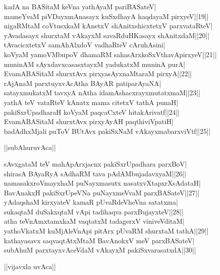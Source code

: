\documentclass{article}
\begin{document}
kadA na BASitaM keVna  yathAyaM pariBASateV|\\
mameYvaM piVDayxmAnasayx kuSxdhayA haqdayaM pirxyeV||19||\\
nigaRMtaM coVtusxkaM kAnetxV shAnitxshicxtetxV parxvataRteV|\\
yAvadasayx shurxtaM vAkayxM savaRduHKasayx shAnitxdaM||20||\\
tAvacicxtetxV samAhAlxdoV vadhaRteV cAruhAsini|\\
koVyaM yamoVMbupoV dhamaRM sahasArxkoSxVthavApirxyeV||21||\\
muninAM sAyxdavxcasasxtayxM yadukatxM muninA purA|\\
EvamABASitaM shurxtAvx pirxyasAyxnaMtaraM pirxyA||22||\\
rAjAnaM parxtuyxvAcAtha BAyAR patiparAyaNA|\\
satayxmukatxM tavxyA nAtha idamAshacxrayxmutatxmaM||23||\\
yathA teV vataRteV kAnatx mama citetxV tathA punaH|\\
pakiSxrUpadharaH koVyaM paqcaCxteV hitakArivatf||24||\\
EvamABASitaM shurxtAvx pirxyAyAH paqthiviVpatiH|\\
badAdhxMjali puToV BUtAvx pakiSxNaM vAkayxmabarxviVtf||25||\\

\begin{center}
||subAhuruvAca||
\end{center}

sAvxgataM teV mahApArxjacnx pakiSxrUpadhara parxBoV|\\
shirasA BAyaRyA sAdhaRM tava pAdAMbujadavxyaM||26||\\
namasakxroVmayxhaM puNayxmasutx nasatxvXtapxrXsAdataH|\\
BavAnakxH pakiSxrUpeVNa puNayxmeVvaM parxBASateV||27||\\
yAdaqshaM kirxyateV kamaR pUvaRdeVheVna satatxma|\\
sukaqtaM duSakxqtaM vApi tadihaqva parxBujayxteV||28||\\
atha teVnAmxtamxkaM vaqtatxM tadagerxV viniveVditaM|\\
yathoVkatxM kuMjAleVnApi pitArx pUvaRM shurxtaM tathA||29||\\
kathayasavx saqvaqtAtxMtaM BavAnokxV meV parxBASateV|\\
subAhuM parxtayxvAceVdaM vAkayxM pakiSxvarasatxdA||30||\\

\begin{center}
||vijavxla uvAca||
\end{center}
\end{document}
